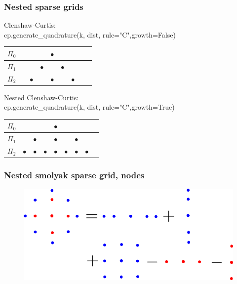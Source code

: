 \documentclass{beamer}
\begin{document}
 \begin{frame}
  \frametitle{Nested sparse grids}
  
 Clenshaw-Curtis:\\
 cp.generate\_quadrature(k, dist, rule="C",growth=False)
  \begin{table}
  \begin{tabular}{lcccccccc}
    $\Pi_0$& &&& $\bullet$& &&&  \\\hline
   $\Pi_1$ &&&$\bullet$& &$\bullet$&&& \\\hline
   $\Pi_2$ &&$\bullet$&&$\bullet$ &&$\bullet$&& \\
   \end{tabular}
  \end{table}
  
  
  Nested Clenshaw-Curtis:\\
  cp.generate\_quadrature(k, dist, rule="C",growth=True)
  \begin{table}
  \begin{tabular}{lcccccccc}
    $\Pi_0$& &&& $\bullet$& &&&  \\\hline
   $\Pi_1$ &&$\bullet$&& $\bullet$&&$\bullet$ && \\\hline
   $\Pi_2$ &$\bullet$&$\bullet$&$\bullet$& $\bullet$&$\bullet$&$\bullet$ &$\bullet$& \\
   \end{tabular}
  \end{table}
 
  \end{frame}

\begin{frame}
 \frametitle{Nested smolyak sparse grid, nodes}


 \begin{figure}
  \includegraphics[width=\textwidth]{smolyak_nested.png}
 \end{figure}

\end{frame}
\end{document}
